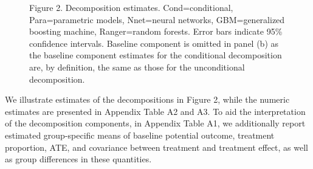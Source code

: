 \documentclass[12pt,a4paper]{article}
\begin{document}
\begin{figure}
\centering


\caption*{Figure 2. Decomposition estimates. Cond=conditional, Para=parametric models, Nnet=neural networks, GBM=generalized boosting machine, Ranger=random forests. Error bars indicate 95\% confidence intervals. Baseline component is omitted in panel (b) as the baseline component estimates for the conditional decomposition are, by definition, the same as those for the unconditional decomposition.} \label{fig:Result}
\end{figure}

We illustrate estimates of the decompositions in Figure 2, while the numeric estimates are presented in Appendix Table A2 and A3. To aid the interpretation of the decomposition components, in Appendix Table A1, we additionally report estimated group-specific means of baseline potential outcome, treatment proportion, ATE, and covariance between treatment and treatment effect, as well as group differences in these quantities. 
\end{document}
